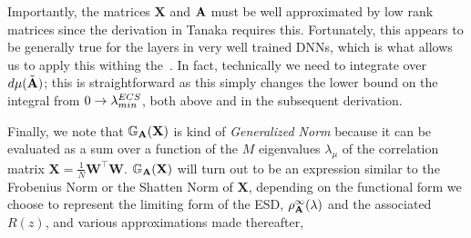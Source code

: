 Importantly, the matrices $\mathbf{X}$  and $\mathbf{\mathbf{A}}$ must be well approximated
by low rank matrices since the derivation in Tanaka requires this.  Fortunately,
this appears to be generally true for the layers in very well trained DNNs,
which is what allows us to apply this withing the~\ECS.
In fact, technically we need to integrate over $d\mu(\tilde{\mathbf{A}})$; this is straightforward
as this simply changes the lower bound on the integral from $0\rightarrow\lambda^{ECS}_{min}$,
both above and in the subsequent derivation.

Finally, we note that $\mathbb{G}_{\mathbf{A}}(\mathbf{X})$ is kind of \emph{Generalized Norm} because 
it can be evaluated as a sum over a function of the $M$ eigenvalues $\lambda_{\mu}$ of the \Teacher
correlation matrix $\mathbf{X}=\frac{1}{N}\mathbf{W}^{\top}\mathbf{W}$.
$\mathbb{G}_{\mathbf{A}}(\mathbf{X})$ will turn out to be an expression similar to the Frobenius Norm or the
Shatten Norm of $\mathbf{X}$, depending on the functional form we choose to represent the
limiting form of the \Student ESD, $\rho_{\mathbf{A}}^{\infty}(\lambda)$ and the associated \RTransform $R(z)$, and various approximations made thereafter,






%
